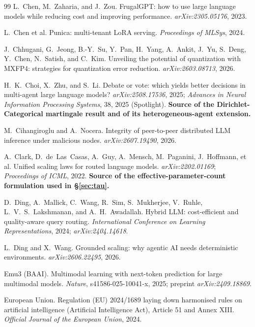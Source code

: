 \documentclass[11pt]{article}
\begin{document}
\begin{thebibliography}{99}
 L.~Chen, M.~Zaharia, and J.~Zou. FrugalGPT: how to use large language models while reducing cost and improving performance. \emph{arXiv:2305.05176}, 2023.

 L.~Chen et al. Punica: multi-tenant LoRA serving. \emph{Proceedings of MLSys}, 2024.

 J.~Chhugani, G.~Jeong, B.-Y.~Su, Y.~Pan, H.~Yang, A.~Ankit, J.~Yu, S.~Deng, Y.~Chen, N.~Satish, and C.~Kim. Unveiling the potential of quantization with MXFP4: strategies for quantization error reduction. \emph{arXiv:2603.08713}, 2026.

 H.~K.~Choi, X.~Zhu, and S.~Li. Debate or vote: which yields better decisions in multi-agent large language models? \emph{arXiv:2508.17536}, 2025; \emph{Advances in Neural Information Processing Systems}, 38, 2025 (Spotlight). \textbf{Source of the Dirichlet-Categorical martingale result and of its heterogeneous-agent extension.}

 M.~Cihangiroglu and A.~Nocera. Integrity of peer-to-peer distributed LLM inference under malicious nodes. \emph{arXiv:2607.19490}, 2026.

 A.~Clark, D.~de~Las~Casas, A.~Guy, A.~Mensch, M.~Paganini, J.~Hoffmann, et al. Unified scaling laws for routed language models. \emph{arXiv:2202.01169}; \emph{Proceedings of ICML}, 2022. \textbf{Source of the effective-parameter-count formulation used in \S\ref{sec:tau}.}

 D.~Ding, A.~Mallick, C.~Wang, R.~Sim, S.~Mukherjee, V.~Ruhle, L.~V.~S.~Lakshmanan, and A.~H.~Awadallah. Hybrid LLM: cost-efficient and quality-aware query routing. \emph{International Conference on Learning Representations}, 2024; \emph{arXiv:2404.14618}.

 L.~Ding and X.~Wang. Grounded scaling: why agentic AI needs deterministic environments. \emph{arXiv:2606.22495}, 2026.

 Emu3 (BAAI). Multimodal learning with next-token prediction for large multimodal models. \emph{Nature}, s41586-025-10041-x, 2025; preprint \emph{arXiv:2409.18869}.

 European Union. Regulation (EU) 2024/1689 laying down harmonised rules on artificial intelligence (Artificial Intelligence Act), Article 51 and Annex XIII. \emph{Official Journal of the European Union}, 2024.


\end{thebibliography}
\end{document}
